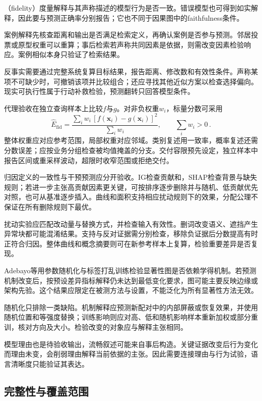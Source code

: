 （fidelity）度量解释与其声称描述的模型行为是否一致。错误模型也可得到如实解释，因此要与预测正确率分别报告；它也不同于因果图中的faithfulness条件。

案例解释先核查距离和输出是否满足检索定义，再确认案例是否参与预测。邻居投票或原型权重可以重算；事后检索若声称共同因素是依据，则需改变因素检验响应。案例相似本身只验证了检索结果。

反事实需要通过完整系统复算目标结果，报告距离、修改数和有效性条件。声称某项不可缺少时，可撤销该项并比较组合；还应寻找其他近似方案以检查选择偏向。现实可执行性属于行动补救检验，预测翻转只回答模型条件。

代理验收在独立查询样本上比较$f$与$g$。对非负权重$w_i$，标量分数可采用
\[
 \widehat E_{\mathrm{fid}}
 =\frac{\sum_i w_i\,[f(\bm{x}_i)-g(\bm{x}_i)]^2}
        {\sum_i w_i},\qquad \sum_iw_i>0\, .
\]
整体权重应对应参考范围，局部权重对应邻域。类别复述用一致率，概率复述还需分数误差；应按业务分组检查被均值掩盖的分支。交付容限预先设定，独立样本中报告区间或重采样波动，超限时收窄范围或拒绝交付。

归因定义的一致性与干预预测应分开验收。IG检查贡献和，SHAP检查背景与缺失规则；若进一步主张高贡献因素更关键，可按排序逐步删除并与随机、低贡献优先对照，也可从基准逐步插入。曲线和面积支持相应扰动规则下的效果，分配公理不保证在所有删除规则下最优。

扰动实验应匹配改动量与替换方式，并检查输入有效性。删词改变语义、遮挡产生异常块都可能混淆结果。支持与反对证据需分别检查，移除负证据后分数提高有时正符合归因。整体曲线和概念摘要则可在新参考样本上复算，检验重要差异是否复现。

Adebayo等用参数随机化与标签打乱训练检验显著性图是否依赖学得机制。若预测机制改变后，按预设差异指标解释仍未达到最低变化要求，图可能主要反映边缘或架构先验。这个结果应限定在被测方法与设置，不能泛化为所有显著性方法无效。

随机化只排除一类缺陷。机制解释应预测新配对中的内部屏蔽或恢复效果，并使用随机位置和等强度替换；训练影响则应对高、低和随机影响样本重新加权或部分重训，核对方向及大小。检验改变的对象应与解释主张相同。

模型理由也是待验收输出，流畅叙述可能来自事后构造。关键证据改变后行为变化而理由未变，会削弱理由解释当前依据的主张。因此需要连接理由与行为试验，语言清晰度只能验证其表达。

\subsection{完整性与覆盖范围}
\label{sec:interpretability-quality-coverage}

